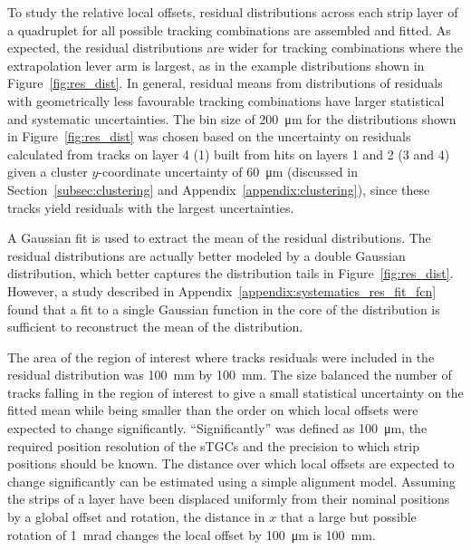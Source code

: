 To study the relative local offsets, residual distributions across each strip layer of a quadruplet for all possible tracking combinations are assembled and fitted. As expected, the residual distributions are wider for tracking combinations where the extrapolation lever arm is largest, as in the example distributions shown in Figure~\ref{fig:res_dist}. In general, residual means from distributions of residuals with geometrically less favourable tracking combinations have larger statistical and systematic uncertainties. The bin size of \SI{200}{\micro\meter} for the distributions shown in Figure~\ref{fig:res_dist} was chosen based on the uncertainty on residuals calculated from tracks on layer 4 (1) built from hits on layers 1 and 2 (3 and 4) given a cluster $y$-coordinate uncertainty of \SI{60}{\micro\meter} (discussed in Section~\ref{subsec:clustering} and Appendix~\ref{appendix:clustering}), since these tracks yield residuals with the largest uncertainties.

A Gaussian fit is used to extract the mean of the residual distributions. The residual distributions are actually better modeled by a double Gaussian distribution, which better captures the distribution tails in Figure~\ref{fig:res_dist}. However, a study described in Appendix~\ref{appendix:systematics_res_fit_fcn} found that a fit to a single Gaussian function in the core of the distribution is sufficient to reconstruct the mean of the distribution.

The area of the region of interest where tracks residuals were included in the residual distribution was \SI{100}{\milli\meter} by \SI{100}{\milli\meter}. The size balanced the number of tracks falling in the region of interest to give a small statistical uncertainty on the fitted mean while being smaller than the order on which local offsets were expected to change significantly. ``Significantly'' was defined as \SI{100}{\micro\meter}, the required position resolution of the sTGCs and the precision to which strip positions should be known. The distance over which local offsets are expected to change significantly can be estimated using a simple alignment model. Assuming the strips of a layer have been displaced uniformly from their nominal positions by a global offset and rotation, the distance in $x$ that a large but possible rotation of \SI{1}{mrad} changes the local offset by \SI{100}{\micro\meter} is \SI{100}{mm}.

